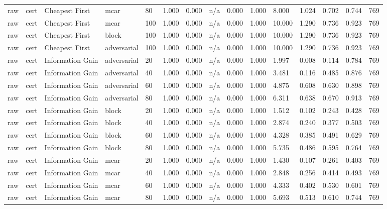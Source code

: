 \begin{table}[!ht]
{\begin{tabular}{lllllllllllllll}
raw & cert & Cheapest First & mcar & 80 & 1.000 & 0.000 & n/a & 0.000 & 1.000 & 8.000 & 1.024 & 0.702 & 0.744 & 769 \\
raw & cert & Cheapest First & mcar & 100 & 1.000 & 0.000 & n/a & 0.000 & 1.000 & 10.000 & 1.290 & 0.736 & 0.923 & 769 \\
raw & cert & Cheapest First & block & 100 & 1.000 & 0.000 & n/a & 0.000 & 1.000 & 10.000 & 1.290 & 0.736 & 0.923 & 769 \\
raw & cert & Cheapest First & adversarial & 100 & 1.000 & 0.000 & n/a & 0.000 & 1.000 & 10.000 & 1.290 & 0.736 & 0.923 & 769 \\
raw & cert & Information Gain & adversarial & 20 & 1.000 & 0.000 & n/a & 0.000 & 1.000 & 1.997 & 0.008 & 0.114 & 0.784 & 769 \\
raw & cert & Information Gain & adversarial & 40 & 1.000 & 0.000 & n/a & 0.000 & 1.000 & 3.481 & 0.116 & 0.485 & 0.876 & 769 \\
raw & cert & Information Gain & adversarial & 60 & 1.000 & 0.000 & n/a & 0.000 & 1.000 & 4.875 & 0.608 & 0.630 & 0.898 & 769 \\
raw & cert & Information Gain & adversarial & 80 & 1.000 & 0.000 & n/a & 0.000 & 1.000 & 6.311 & 0.638 & 0.670 & 0.913 & 769 \\
raw & cert & Information Gain & block & 20 & 1.000 & 0.000 & n/a & 0.000 & 1.000 & 1.512 & 0.102 & 0.243 & 0.428 & 769 \\
raw & cert & Information Gain & block & 40 & 1.000 & 0.000 & n/a & 0.000 & 1.000 & 2.874 & 0.240 & 0.377 & 0.503 & 769 \\
raw & cert & Information Gain & block & 60 & 1.000 & 0.000 & n/a & 0.000 & 1.000 & 4.328 & 0.385 & 0.491 & 0.629 & 769 \\
raw & cert & Information Gain & block & 80 & 1.000 & 0.000 & n/a & 0.000 & 1.000 & 5.735 & 0.486 & 0.595 & 0.764 & 769 \\
raw & cert & Information Gain & mcar & 20 & 1.000 & 0.000 & n/a & 0.000 & 1.000 & 1.430 & 0.107 & 0.261 & 0.403 & 769 \\
raw & cert & Information Gain & mcar & 40 & 1.000 & 0.000 & n/a & 0.000 & 1.000 & 2.848 & 0.256 & 0.414 & 0.493 & 769 \\
raw & cert & Information Gain & mcar & 60 & 1.000 & 0.000 & n/a & 0.000 & 1.000 & 4.333 & 0.402 & 0.530 & 0.601 & 769 \\
raw & cert & Information Gain & mcar & 80 & 1.000 & 0.000 & n/a & 0.000 & 1.000 & 5.693 & 0.513 & 0.610 & 0.744 & 769 \\

\end{tabular}}
\end{table}
